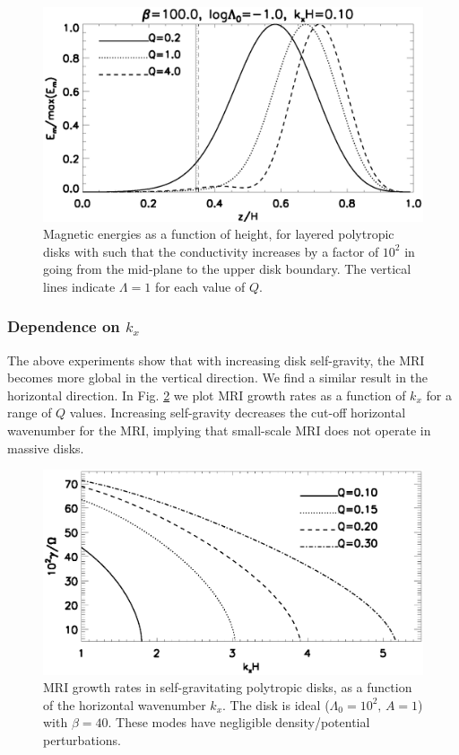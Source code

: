 
\begin{figure}
  \includegraphics[width=\linewidth]{figures/compare_results_poly_layer_amp100}
  \caption{Magnetic energies as a function of height, for layered polytropic disks with
    such that the conductivity increases by a 
    factor of $10^2$ in going from the mid-plane to the upper disk
    boundary. The vertical lines indicate $\Lambda=1$ for each value
    of $Q$.
    \label{poly_layer}}
\end{figure}

\subsubsection{Dependence on $k_x$}
The above experiments show that with increasing 
disk self-gravity, the MRI becomes more global in the vertical
direction. We find a similar result in the horizontal direction. 
In Fig. \ref{compare_growth_poly_kx} we plot MRI growth rates as a
function of $k_x$ for a range of $Q$ values. Increasing self-gravity
decreases the cut-off horizontal wavenumber for the MRI, implying that
small-scale MRI does not operate in massive disks. 
 
\begin{figure}
  \includegraphics[width=\linewidth]{figures/compare_growth_poly_varQ_kx}
  \caption{MRI growth rates in self-gravitating polytropic disks, as a
    function of the horizontal wavenumber $k_x$. The disk is ideal
    ($\Lambda_0=10^2,\, A=1$) with $\beta = 40$. These modes have negligible
    density/potential perturbations.  
    \label{compare_growth_poly_kx}}
\end{figure}


